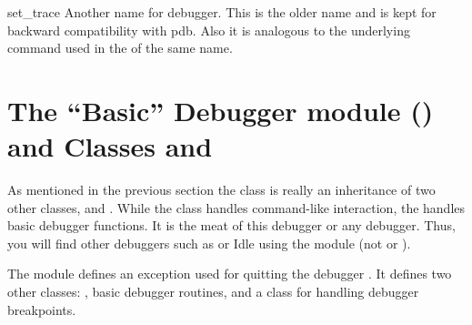 \begin{funcdesc}{set_trace}{}\label{debugger}
Another name for debugger. This is the older name and is kept for
backward compatibility with pdb. Also it is analogous to the
underlying command used in the  of the same name.
\end{funcdesc}

\section{The ``Basic'' Debugger module () and Classes  and \label{bdb-module-class}}

As mentioned in the previous section the  class is really
an inheritance of two other classes,  and
. While the  class handles command-like
interaction, the  handles basic debugger functions. It is
the meat of this debugger or any debugger. Thus, you will find other
debuggers such as
 or Idle
using the  module (not  or ).

The module defines an exception used for quitting the debugger
. It defines two other classes: , basic
debugger routines, and  a class for handling
debugger breakpoints.

